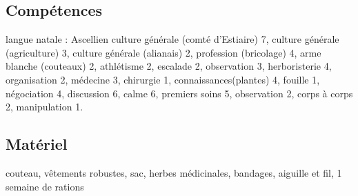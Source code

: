\documentclass[10pt,a4paper]{article}
\begin{document}
\subsection{Compétences}
langue natale : Ascellien
culture générale (comté d'Estiaire) 7, culture générale (agriculture) 3, culture générale (alianais) 2, profession (bricolage) 4, arme blanche (couteaux) 2, athlétisme 2, escalade 2, observation 3, herboristerie 4, organisation 2, médecine 3, chirurgie 1, connaissances(plantes) 4, fouille 1, négociation 4, discussion 6, calme 6, premiers soins 5, observation 2, corps à corps 2, manipulation 1.
\subsection{Matériel}
couteau, vêtements robustes, sac, herbes médicinales, bandages, aiguille et fil, 1 semaine de rations
\end{document}
